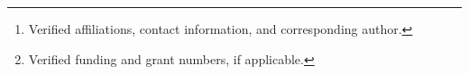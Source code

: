 \author{Author names%
\thanks{Verified affiliations, contact information, and corresponding author.}%
\thanks{Verified funding and grant numbers, if applicable.}}
